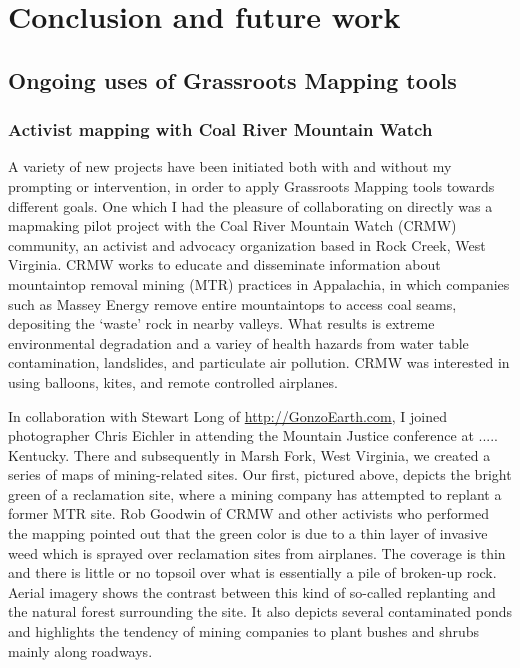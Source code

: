 \documentclass[11pt]{report}
\begin{document}
\chapter{Conclusion and future work}

\section{Ongoing uses of Grassroots Mapping tools}
\label{sec:ongoinguses}

\subsection{Activist mapping with Coal River Mountain Watch}

A variety of new projects have been initiated both with and without my prompting or intervention, in order to apply Grassroots Mapping tools towards different goals. One which I had the pleasure of collaborating on directly was a mapmaking pilot project with the Coal River Mountain Watch (CRMW) community, an activist and advocacy organization based in Rock Creek, West Virginia. CRMW works to educate and disseminate information about mountaintop removal mining (MTR) practices in Appalachia, in which companies such as Massey Energy remove entire mountaintops to access coal seams, depositing the `waste' rock in nearby valleys. What results is extreme environmental degradation and a variey of health hazards from water table contamination, landslides, and particulate air pollution. CRMW was interested in using balloons, kites, and remote controlled airplanes. 


In collaboration with Stewart Long of \url{http://GonzoEarth.com}, I joined photographer Chris Eichler in attending the Mountain Justice conference at ..... Kentucky. There and subsequently in Marsh Fork, West Virginia, we created a series of maps of mining-related sites. Our first, pictured above, depicts the bright green of a reclamation site, where a mining company has attempted to replant a former MTR site. Rob Goodwin of CRMW and other activists who performed the mapping pointed out that the green color is due to a thin layer of invasive weed which is sprayed over reclamation sites from airplanes. The coverage is thin and there is little or no topsoil over what is essentially a pile of broken-up rock. Aerial imagery shows the contrast between this kind of so-called replanting and the natural forest surrounding the site. It also depicts several contaminated ponds and highlights the tendency of mining companies to plant bushes and shrubs mainly along roadways. 
\end{document}

